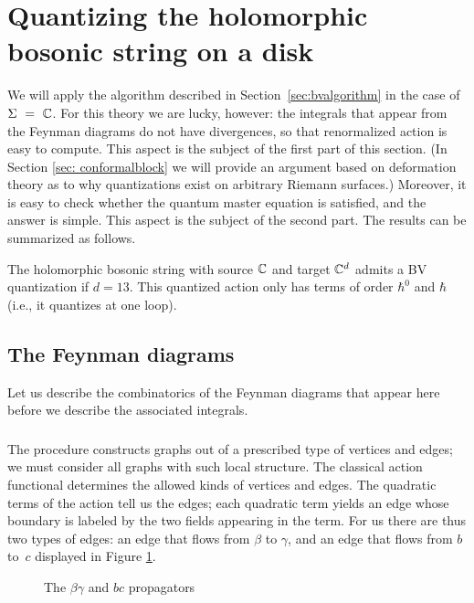 \section{Quantizing the holomorphic bosonic string on a disk} 
\label{sec: quantization}

We will apply the algorithm described in Section~\ref{sec:bvalgorithm}
in the case of $\Sigma~=~\mathbb C$.
For this theory we are lucky, however:
the integrals that appear from the Feynman diagrams do not have divergences,
so that renormalized action is easy to compute.
This aspect is the subject of the first part of this section.
(In Section \ref{sec: conformalblock} we will provide an argument based on deformation theory as to why quantizations exist on arbitrary Riemann surfaces.)
Moreover, it is easy to check whether the quantum master equation is satisfied,
and the answer is simple.
This aspect is the subject of the second part.
The results can be summarized as follows.

\begin{prop}
The holomorphic bosonic string with source $\mathbb C$ and target $\mathbb C^d$ admits a BV quantization
if $d = 13$.
This quantized action only has terms of order $\hbar^0$ and $\hbar$ (i.e., it quantizes at one loop).
\end{prop}

\subsection{The Feynman diagrams}

Let us describe the combinatorics of the Feynman diagrams that appear here
before we describe the associated integrals.

\subsubsection{}

The procedure constructs graphs out of a prescribed type of vertices and edges;
we must consider all graphs with such local structure.
The classical action functional determines the allowed kinds of vertices and edges.
The quadratic terms of the action tell us the edges;
each quadratic term yields an edge whose boundary is labeled by the two fields appearing in the term.
For us there are thus two types of edges: 
an edge that flows from $\beta$ to $\gamma$, 
and an edge that flows from $b$ to~$c$ displayed in Figure \ref{fig:props}.
\begin{figure}
\caption{The $\beta\gamma$ and $bc$ propagators}
\label{fig:props}
\end{figure}

